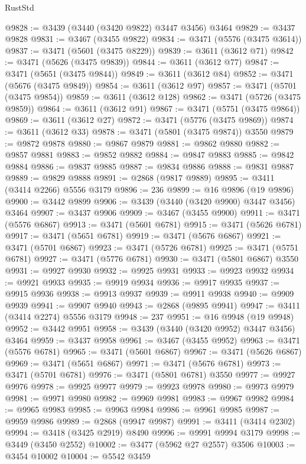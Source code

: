 \begin{lexlean}{RustStd}
\begin{coremodule}
{{{{{{{{{{{{{{{{{{{@9828 := @3439 (@3440 (@3420 @9822) @3447 @3456) @3464
@9829 := @3437 @9828
@9831 := @3467 (@3455 @9822)
@9834 := @3471 (@5576 (@3475 @3614))
@9837 := @3471 (@5601 (@3475 @8229))
@9839 := @3611 (@3612 @71)
@9842 := @3471 (@5626 (@3475 @9839))
@9844 := @3611 (@3612 @77)
@9847 := @3471 (@5651 (@3475 @9844))
@9849 := @3611 (@3612 @84)
@9852 := @3471 (@5676 (@3475 @9849))
@9854 := @3611 (@3612 @97)
@9857 := @3471 (@5701 (@3475 @9854))
@9859 := @3611 (@3612 @128)
@9862 := @3471 (@5726 (@3475 @9859))
@9864 := @3611 (@3612 @91)
@9867 := @3471 (@5751 (@3475 @9864))
@9869 := @3611 (@3612 @27)
@9872 := @3471 (@5776 (@3475 @9869))
@9874 := @3611 (@3612 @33)
@9878 := @3471 (@5801 (@3475 @9874)) @3550
@9879 := @9872 @9878
@9880 := @9867 @9879
@9881 := @9862 @9880
@9882 := @9857 @9881
@9883 := @9852 @9882
@9884 := @9847 @9883
@9885 := @9842 @9884
@9886 := @9837 @9885
@9887 := @9834 @9886
@9888 := @9831 @9887
@9889 := @9829 @9888
@9891 := @2868 (@9817 @9889)
@9895 := @3411 (@3414 @2266) @5556 @3179
@9896 := 236
@9899 := @16 @9896 (@19 @9896)
@9900 := @3442 @9899
@9906 := @3439 (@3440 (@3420 @9900) @3447 @3456) @3464
@9907 := @3437 @9906
@9909 := @3467 (@3455 @9900)
@9911 := @3471 (@5576 @6867)
@9913 := @3471 (@5601 @6781)
@9915 := @3471 (@5626 @6781)
@9917 := @3471 (@5651 @6781)
@9919 := @3471 (@5676 @6867)
@9921 := @3471 (@5701 @6867)
@9923 := @3471 (@5726 @6781)
@9925 := @3471 (@5751 @6781)
@9927 := @3471 (@5776 @6781)
@9930 := @3471 (@5801 @6867) @3550
@9931 := @9927 @9930
@9932 := @9925 @9931
@9933 := @9923 @9932
@9934 := @9921 @9933
@9935 := @9919 @9934
@9936 := @9917 @9935
@9937 := @9915 @9936
@9938 := @9913 @9937
@9939 := @9911 @9938
@9940 := @9909 @9939
@9941 := @9907 @9940
@9943 := @2868 (@9895 @9941)
@9947 := @3411 (@3414 @2274) @5556 @3179
@9948 := 237
@9951 := @16 @9948 (@19 @9948)
@9952 := @3442 @9951
@9958 := @3439 (@3440 (@3420 @9952) @3447 @3456) @3464
@9959 := @3437 @9958
@9961 := @3467 (@3455 @9952)
@9963 := @3471 (@5576 @6781)
@9965 := @3471 (@5601 @6867)
@9967 := @3471 (@5626 @6867)
@9969 := @3471 (@5651 @6867)
@9971 := @3471 (@5676 @6781)
@9973 := @3471 (@5701 @6781)
@9976 := @3471 (@5801 @6781) @3550
@9977 := @9927 @9976
@9978 := @9925 @9977
@9979 := @9923 @9978
@9980 := @9973 @9979
@9981 := @9971 @9980
@9982 := @9969 @9981
@9983 := @9967 @9982
@9984 := @9965 @9983
@9985 := @9963 @9984
@9986 := @9961 @9985
@9987 := @9959 @9986
@9989 := @2868 (@9947 @9987)
@9991 := @3411 (@3414 @2302)
@9994 := @3418 (@3425 @2919) @8490
@9996 := @9991 @9994 @3179
@9998 := @3449 (@3450 @2552)
@10002 := @3477 (@5962 @27 @2557) @3506
@10003 := @3454 @10002
@10004 := @5542 @3459
}}}}}}}}}}}}}}}}}}}
\end{coremodule}
\end{lexlean}
